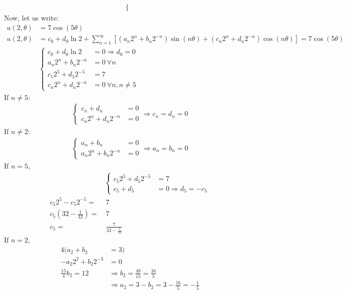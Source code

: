 \documentclass{article}
\begin{document}
\begin{enumerate}
\begin{align}
\begin{cases}
    \end{cases}
  \end{align}
  Now, let us write:
  \begin{align}
    u(2, \theta) & = 7 \cos(5 \theta)\\
    u(2, \theta) & = c_0 + d_0 \ln 2 + \sum^\infty_{n = 1}
    \left[
    (a_n 2^n + b_n 2^{-n}) \sin( n \theta ) +
    (c_n 2^n + d_n 2^{-n}) \cos( n \theta )
    \right] = 7 \cos(5 \theta)\\
    &
    \begin{cases}
      c_0 + d_0 \ln 2       & = 0 \Rightarrow d_0 = 0\\
      a_n 2^n + b_n 2^{-n}  & = 0\ \forall n\\
      c_5 2^5 + d_5 2^{-5}  & = 7\\
      c_n 2^n + d_n 2^{-n}  & = 0\ \forall n, n \neq 5
    \end{cases}
  \end{align}
  If $n \neq 5$:
  \begin{align}
    \begin{cases}
      c_n + d_n & = 0\\
      c_n 2^n + d_n 2^{-n} & = 0
    \end{cases}
    \Rightarrow c_n = d_n = 0
  \end{align}
  If $n \neq 2$:
  \begin{align}
    \begin{cases}
      a_n     + b_n & = 0\\
      a_n 2^n + b_n 2^{-n} & = 0
    \end{cases}
    \Rightarrow a_n = b_n = 0
  \end{align}
  If $n = 5$,
  \begin{align}
    &
    \begin{cases}
      c_5 2^5 + d_5 2^{-5} & = 7\\
      c_5     + d_5        & = 0 \Rightarrow d_5 = -c_5
    \end{cases}\\
    c_5 2^5 - c_5 2^{-5} = &\ 7\\
    c_5(32 - \frac{1}{32}) = &\ 7\\
    c_5 = &\ \frac{7}{32 - \frac{1}{32}}
  \end{align}
  If $n = 2$,
  \begin{align}
    4(a_2 + b_2 & = 3) \\
    - a_2 2^2 + b_2 2^{-3} & = 0\\
    \hline
    \frac{15}{4} b_2 = 12 & \Rightarrow b_2 = \frac{48}{15} = \frac{16}{5}\\
    & \Rightarrow a_2 = 3 - b_2 = 3 - \frac{16}{5} = -\frac{1}{5}
  \end{align}
\end{enumerate}
\end{document}
